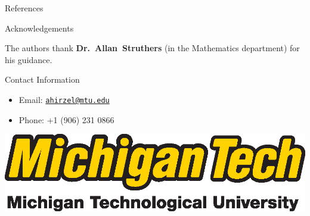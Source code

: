 \documentclass[final]{beamer}
\newlength{\onecolwid}
\begin{document}
\begin{frame}[t]
\begin{columns}[t]
\begin{column}{\onecolwid}
\begin{block}{References}
\end{block}



\begin{block}{Acknowledgements}

The authors thank \textbf{Dr.~Allan~Struthers} (in the Mathematics department)
for his guidance.

\end{block}



\begin{block}{Contact Information}

\begin{itemize}
\item Email: \href{mailto:ahirzel@mtu.edu}{\texttt{ahirzel@mtu.edu}}
\item Phone: +1 (906) 231 0866
\end{itemize}

\end{block}

\begin{center}
\includegraphics[width=0.4\linewidth]{logo_withfullname_LG.eps}
\end{center}


\end{column} %

\end{columns} %

\end{frame} %
\end{document}
